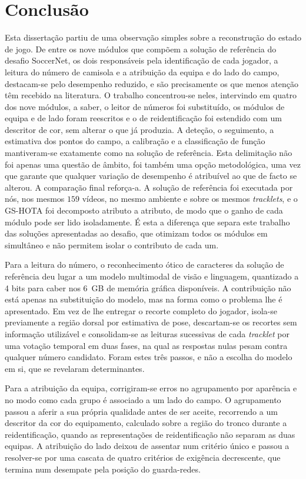 \chapter{Conclusão}\label{cap:conclusao}

Esta dissertação partiu de uma observação simples sobre a reconstrução do estado de jogo. De entre
os nove módulos que compõem a solução de referência do desafio SoccerNet, os dois responsáveis pela
identificação de cada jogador, a leitura do número de camisola e a atribuição da equipa e do lado do
campo, destacam-se pelo desempenho reduzido, e são precisamente os que menos atenção têm recebido
na literatura. O trabalho concentrou-se neles, intervindo em quatro dos nove módulos, a saber, o leitor de
números foi substituído, os módulos de equipa e de lado foram reescritos e o de reidentificação foi
estendido com um descritor de cor, sem alterar o que já produzia. A deteção, o seguimento, a
estimativa dos pontos do campo, a calibração e a classificação de função mantiveram-se exatamente
como na solução de referência. Esta delimitação não foi apenas uma questão de âmbito, foi também uma
opção metodológica, uma vez que garante que qualquer variação de desempenho é atribuível ao que de
facto se alterou. A comparação final reforça-a. A solução de referência foi executada por nós, nos
mesmos $159$ vídeos, no mesmo ambiente e sobre os mesmos \emph{tracklets}, e o GS-HOTA foi
decomposto atributo a atributo, de modo que o ganho de cada módulo pode ser lido isoladamente. É
esta a diferença que separa este trabalho das soluções apresentadas ao desafio, que otimizam todos
os módulos em simultâneo e não permitem isolar o contributo de cada um.

Para a leitura do número, o reconhecimento ótico de caracteres da solução de referência deu lugar a
um modelo multimodal de visão e linguagem, quantizado a 4 bits para caber nos 6~GB de memória
gráfica disponíveis. A contribuição não está apenas na substituição do modelo, mas na forma como o
problema lhe é apresentado. Em vez de lhe entregar o recorte completo do jogador, isola-se
previamente a região dorsal por estimativa de pose, descartam-se os recortes sem informação
utilizável e consolidam-se as leituras sucessivas de cada \emph{tracklet} por uma votação temporal
em duas fases, na qual as respostas nulas pesam contra qualquer número candidato. Foram estes três
passos, e não a escolha do modelo em si, que se revelaram determinantes.

Para a atribuição da equipa, corrigiram-se erros no agrupamento por aparência e no modo como cada
grupo é associado a um lado do campo. O agrupamento passou a aferir a sua própria qualidade antes de
ser aceite, recorrendo a um descritor da cor do equipamento, calculado sobre a região do tronco
durante a reidentificação, quando as representações de reidentificação não separam as duas equipas.
A atribuição do lado deixou de assentar num critério único e passou a resolver-se por uma cascata
de quatro critérios de exigência decrescente, que termina num desempate pela posição do
guarda-redes.

